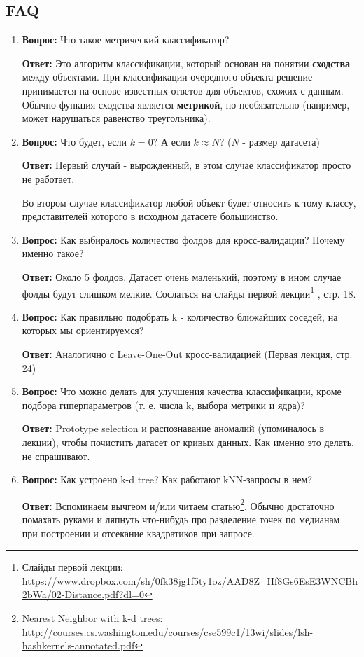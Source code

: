 \documentclass[a4paper, unicode]{article}
\begin{document}
\subsection{FAQ}
\label{sec:orgheadline4}
\begin{enumerate}
\item \textbf{Вопрос:}
   Что такое метрический классификатор?

\textbf{Ответ:}
Это алгоритм классификации, который основан на понятии \textbf{сходства} между
объектами. При классификации очередного объекта решение принимается на основе
известных ответов для объектов, схожих с данным. Обычно функция сходства
является \textbf{метрикой}, но необязательно (например, может нарушаться равенство
треугольника).

\item \textbf{Вопрос:}
   Что будет, если \(k = 0\)? А если \(k \approx N\)? (\(N\) - размер датасета)

\textbf{Ответ:}
Первый случай - вырожденный, в этом случае классификатор просто не работает.

Во втором случае классификатор любой объект будет относить к тому классу,
представителей которого в исходном датасете большинство.

\item \textbf{Вопрос:}
   Как выбиралось количество фолдов для кросс-валидации? Почему именно такое?

\textbf{Ответ:}
Около 5 фолдов. Датасет очень маленький, поэтому в ином случае фолды будут
слишком мелкие. Сослаться на слайды первой лекции\footnote{Слайды первой лекции: \url{https://www.dropbox.com/sh/0fk38jg1f5ty1oz/AAD8Z_Hf8Gs6EsE3WNCBh2bWa/02-Distance.pdf?dl=0}} , стр. 18.

\item \textbf{Вопрос:}
Как правильно подобрать k - количество ближайших соседей, на которых мы
ориентируемся?

\textbf{Ответ:}
Аналогично с Leave-One-Out кросс-валидацией (Первая лекция\footnotemark[1]{}, стр. 24)

\item \textbf{Вопрос:}
Что можно делать для улучшения качества классификации, кроме подбора
гиперпараметров (т. е. числа k, выбора метрики и ядра)?

\textbf{Ответ:}
Prototype selection и распознавание аномалий (упоминалось в лекции\footnotemark[1]{}),
чтобы почистить датасет от кривых данных. Как именно это делать, не
спрашивают.

\item \textbf{Вопрос:}
   Как устроено k-d tree? Как работают kNN-запросы в нем?

\textbf{Ответ:}
Вспоминаем вычгеом и/или читаем статью\footnote{Nearest Neighbor with k-d trees: \url{http://courses.cs.washington.edu/courses/cse599c1/13wi/slides/lsh-hashkernels-annotated.pdf}}.
Обычно достаточно помахать руками и ляпнуть что-нибудь про разделение
точек по медианам при построении и отсекание квадратиков при запросе.
\end{enumerate}
\end{document}
